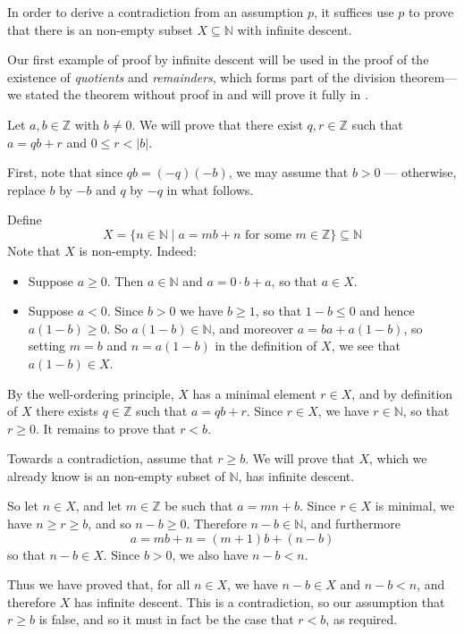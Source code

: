 \begin{strategy}
\label{strInfiniteDescent}
In order to derive a contradiction from an assumption $p$, it suffices use $p$ to prove that there is an non-empty subset $X \subseteq \mathbb{N}$ with infinite descent.
\end{strategy}

Our first example of proof by infinite descent will be used in the proof of the existence of \textit{quotients} and \textit{remainders}, which forms part of the division theorem---we stated the theorem without proof in  and will prove it fully in .

\begin{example}
\label{exQuotientRemainderExistence}
Let $a,b \in \mathbb{Z}$ with $b \ne 0$. We will prove that there exist $q,r \in \mathbb{Z}$ such that $a=qb+r$ and $0 \le r < |b|$.

First, note that since $qb = (-q)(-b)$, we may assume that $b>0$ --- otherwise, replace $b$ by $-b$ and $q$ by $-q$ in what follows.

Define
\[ X = \{ n \in \mathbb{N} \mid a = mb + n \text{ for some } m \in \mathbb{Z} \} \subseteq \mathbb{N} \]
Note that $X$ is non-empty. Indeed:
\begin{itemize}
\item Suppose $a \ge 0$. Then $a \in \mathbb{N}$ and $a = 0 \cdot b + a$, so that $a \in X$.
\item Suppose $a < 0$. Since $b>0$ we have $b \ge 1$, so that $1-b \le 0$ and hence $a(1-b) \ge 0$. So $a(1-b) \in \mathbb{N}$, and moreover $a = ba + a(1-b)$, so setting $m=b$ and $n=a(1-b)$ in the definition of $X$, we see that $a(1-b) \in X$.
\end{itemize}
By the well-ordering principle, $X$ has a minimal element $r \in X$, and by definition of $X$ there exists $q \in \mathbb{Z}$ such that $a=qb+r$. Since $r \in X$, we have $r \in \mathbb{N}$, so that $r \ge 0$. It remains to prove that $r<b$.

Towards a contradiction, assume that $r \ge b$. We will prove that $X$, which we already know is an non-empty subset of $\mathbb{N}$, has infinite descent.

So let $n \in X$, and let $m \in \mathbb{Z}$ be such that $a=mn+b$. Since $r \in X$ is minimal, we have $n \ge r \ge b$, and so $n-b \ge 0$. Therefore $n-b \in \mathbb{N}$, and furthermore
\[ a = mb + n = (m+1)b + (n-b) \]
so that $n-b \in X$. Since $b>0$, we also have $n-b < n$.

Thus we have proved that, for all $n \in X$, we have $n-b \in X$ and $n-b < n$, and therefore $X$ has infinite descent. This is a contradiction, so our assumption that $r \ge b$ is false, and so it must in fact be the case that $r<b$, as required.
\end{example}


